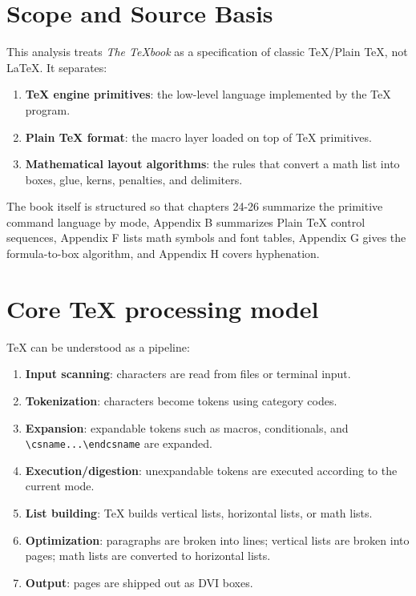 \documentclass[11pt]{article}
\newcommand{\tightlist}{}
\begin{document}
\section{Scope and Source Basis}\label{scope-and-source-basis}

This analysis treats \emph{The TeXbook} as a specification of classic TeX/Plain TeX, not LaTeX. It separates:

\begin{enumerate}
\def\labelenumi{\arabic{enumi}.}
\tightlist
\item
  \textbf{TeX engine primitives}: the low-level language implemented by the TeX program.
\item
  \textbf{Plain TeX format}: the macro layer loaded on top of TeX primitives.
\item
  \textbf{Mathematical layout algorithms}: the rules that convert a math list into boxes, glue, kerns, penalties, and delimiters.
\end{enumerate}

The book itself is structured so that chapters 24-26 summarize the primitive command language by mode, Appendix B summarizes Plain TeX control sequences, Appendix F lists math symbols and font tables, Appendix G gives the formula-to-box algorithm, and Appendix H covers hyphenation.

\section{Core TeX processing model}\label{core-tex-processing-model}

TeX can be understood as a pipeline:

\begin{enumerate}
\def\labelenumi{\arabic{enumi}.}
\tightlist
\item
  \textbf{Input scanning}: characters are read from files or terminal input.
\item
  \textbf{Tokenization}: characters become tokens using category codes.
\item
  \textbf{Expansion}: expandable tokens such as macros, conditionals, and \texttt{\textbackslash{}csname...\textbackslash{}endcsname} are expanded.
\item
  \textbf{Execution/digestion}: unexpandable tokens are executed according to the current mode.
\item
  \textbf{List building}: TeX builds vertical lists, horizontal lists, or math lists.
\item
  \textbf{Optimization}: paragraphs are broken into lines; vertical lists are broken into pages; math lists are converted to horizontal lists.
\item
  \textbf{Output}: pages are shipped out as DVI boxes.
\end{enumerate}
\end{document}
